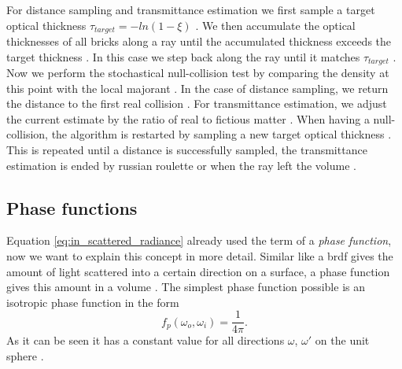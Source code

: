For distance sampling and transmittance estimation we first sample a target optical thickness $\tau_{target}=-ln(1-\xi)$ \cite[p. 6]{brick_grid}.
We then accumulate the optical thicknesses of all bricks along a ray until the accumulated thickness exceeds the target thickness \cite[p. 6]{brick_grid}.
In this case we step back along the ray until it matches $\tau_{target}$ \cite[p. 6]{brick_grid}.
Now we perform the stochastical null-collision test by comparing the density at this point with the local majorant \cite[p. 6]{brick_grid}.
In the case of distance sampling, we return the distance to the first real collision \cite[p. 6]{brick_grid}.
For transmittance estimation, we adjust the current estimate by the ratio of real to fictious matter \cite[p. 6]{brick_grid}.
When having a null-collision, the algorithm is restarted by sampling a new target optical thickness \cite[p. 6]{brick_grid}.
This is repeated until a distance is successfully sampled, the transmittance estimation is ended by russian roulette or when the ray left the volume \cite[p. 6]{brick_grid}.

\subsection{Phase functions}
\label{subsec:phase_function}
Equation \ref{eq:in_scattered_radiance} already used the term of a \textit{phase function}, now we want to explain this concept in more detail.
Similar like a \acs{brdf} gives the amount of light scattered into a certain direction on a surface, a phase function gives this amount in a volume \cite[p. 2]{novak_overview}.
The simplest phase function possible is an isotropic phase function in the form
\begin{equation}
    f_p(\omega_o, \omega_i)=\frac{1}{4\pi}.
\end{equation}
As it can be seen it has a constant value for all directions $\omega$, $\omega'$ on the unit sphere \cite[p. 2]{novak_overview}.

